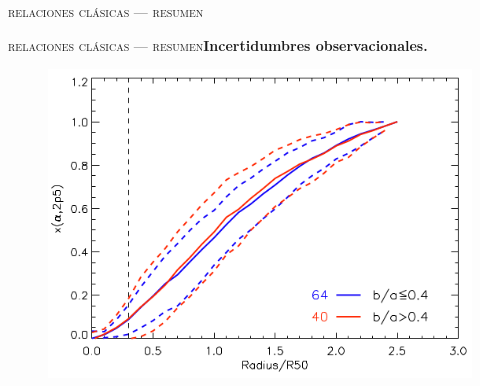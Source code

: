 \documentclass[xcolor=dvipsnames,4pt,hyperref={colorlinks,citecolor=black,linkcolor=black,urlcolor=black}]{beamer}
\begin{document}
\begin{frame}{\textsc{relaciones clásicas --- resumen}}
\end{frame}

\begin{frame}{\textsc{relaciones clásicas --- resumen}}{\textbf{Incertidumbres observacionales.}}


\begin{figure}
\includegraphics[scale=1]{img/iglesias-paramo2013-1}
\end{figure}

\end{frame}
\end{document}
